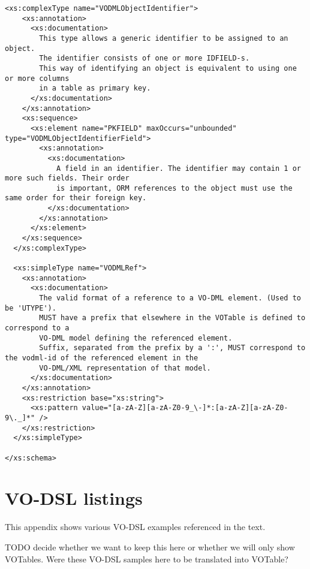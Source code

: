 \documentclass[11pt,a4paper]{ivoa}
\begin{document}
\begin{lstlisting}[label=lst:mapping,caption=VOTable schema extension for VO-DML mapping,frame=tb]
  <xs:complexType name="VODMLObjectIdentifier">
    <xs:annotation>
      <xs:documentation>
        This type allows a generic identifier to be assigned to an object. 
        The identifier consists of one or more IDFIELD-s.
        This way of identifying an object is equivalent to using one or more columns 
        in a table as primary key.
      </xs:documentation>
    </xs:annotation>
    <xs:sequence>
      <xs:element name="PKFIELD" maxOccurs="unbounded" type="VODMLObjectIdentifierField">
        <xs:annotation>
          <xs:documentation>
            A field in an identifier. The identifier may contain 1 or more such fields. Their order 
            is important, ORM references to the object must use the same order for their foreign key.
          </xs:documentation>
        </xs:annotation>
      </xs:element>
    </xs:sequence>
  </xs:complexType>

  <xs:simpleType name="VODMLRef">
    <xs:annotation>
      <xs:documentation>
        The valid format of a reference to a VO-DML element. (Used to be 'UTYPE').
        MUST have a prefix that elsewhere in the VOTable is defined to correspond to a 
        VO-DML model defining the referenced element.
        Suffix, separated from the prefix by a ':', MUST correspond to the vodml-id of the referenced element in the
        VO-DML/XML representation of that model.
      </xs:documentation>
    </xs:annotation>
    <xs:restriction base="xs:string">
      <xs:pattern value="[a-zA-Z][a-zA-Z0-9_\-]*:[a-zA-Z][a-zA-Z0-9\._]*" />
    </xs:restriction>
  </xs:simpleType>

</xs:schema>
\end{lstlisting}

\section{VO-DSL listings}
This appendix shows various VO-DSL examples referenced in the text.

TODO decide whether we want to keep this here or whether we will only show VOTables. 
Were these VO-DSL samples here to be translated into VOTable?
\end{document}
